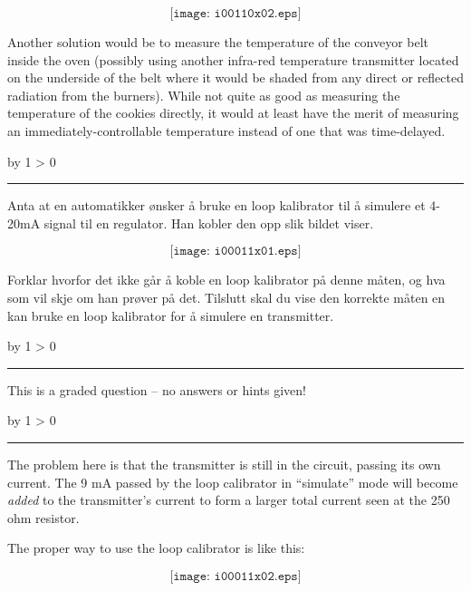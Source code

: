 \documentclass[12pt,a4paper]{article}
\def\oppgave{
            \advance\questnum by 1
            \ifnum \questnum > 0
                 \hrule
                 \vskip 3pt
                 \leftline{Oppgave \the\questnum}
                 \vskip 3pt \fi}
\def\svar{
           \advance\answnum by 1
           \ifnum \answnum > 0
                \hrule
                \vskip 3pt
                \leftline{Svar \the\answnum}
                \vskip 3pt \fi}
\def\notes{
           \advance\explnum by 1
           \ifnum \explnum > 0
                \hrule
                \vskip 3pt
                \leftline{Notes \the\explnum}
                \vskip 3pt \fi}
\begin{document}
$$\texttt{[image: i00110x02.eps]}$$

Another solution would be to measure the temperature of the conveyor belt inside the oven (possibly using another infra-red temperature transmitter located on the underside of the belt where it would be shaded from any direct or reflected radiation from the burners).  While not quite as good as measuring the temperature of the cookies directly, it would at least have the merit of measuring an immediately-controllable temperature instead of one that was time-delayed.


\vfil \eject 



\oppgave{} 

Anta at en automatikker ønsker å bruke en loop kalibrator til å simulere et 4-20mA signal til en regulator. Han kobler den opp slik bildet viser. 

$$\texttt{[image: i00011x01.eps]}$$

Forklar hvorfor det ikke går å koble en loop kalibrator på denne måten, og hva som vil skje om han prøver på det. Tilslutt skal du vise den korrekte måten en kan bruke en loop kalibrator for å simulere en transmitter. 

\vfil

\eject
\vskip 10pt \filbreak 





\svar{} 

This is a graded question -- no answers or hints given!

\vskip 10pt \filbreak 





\notes{} 

The problem here is that the transmitter is still in the circuit, passing its own current.  The 9 mA passed by the loop calibrator in ``simulate'' mode will become {\it added} to the transmitter's current to form a larger total current seen at the 250 ohm resistor.

The proper way to use the loop calibrator is like this:

$$\texttt{[image: i00011x02.eps]}$$
\end{document}

